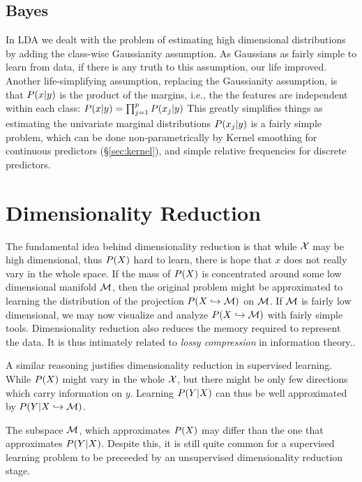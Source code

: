 \subsection{\Naive Bayes}
\label{sec:naive_bayes}
In LDA we dealt with the problem of estimating high dimensional distributions by adding the class-wise Gaussianity assumption. As Gaussians as fairly simple to learn from data, if there is any truth to this assumption, our life improved. 
Another life-simplifying assumption, replacing the Gaussianity assumption, is that $P(x|y)$ is the product of the margins, i.e., the the features are independent within each class: $P(x|y)=\prod_{j=1}^pP(x_j|y)$
This greatly simplifies things as estimating the univariate marginal distributions $P(x_j|y)$ is a fairly simple problem, which can be done non-parametrically by Kernel smoothing for continuous predictors (\S\ref{sec:kernel}), and simple relative frequencies for discrete predictors. 


\section{Dimensionality Reduction}
\label{sec:dim_reduce}
The fundamental idea behind dimensionality reduction is that while $\mathcal{X}$ may be high dimensional, thus $P(X)$ hard to learn, there is hope that $x$ does not really vary in the whole space. 
If the mass of $P(X)$ is concentrated around some low dimensional manifold $\mathcal{M}$, then the original problem might be approximated to learning the distribution of the projection $P(X \hookrightarrow \mathcal{M})$ on $\mathcal{M}$. 
If $\mathcal{M}$ is fairly low dimensional, we may now visualize and analyze $P(X \hookrightarrow \mathcal{M})$ with fairly simple tools.
Dimensionality reduction also reduces the memory required to represent the data. It is thus intimately related to \emph{lossy compression} in information theory..

A similar reasoning justifies dimensionality reduction in supervised learning. While $P(X)$ might vary in the whole $\mathcal{X}$, but there might be only few directions which carry information on $y$. Learning $P(Y|X)$ can thus be well approximated by $P(Y|X \hookrightarrow \mathcal{M})$.


\begin{remark}
The subspace $\mathcal{M}$, which approximates $P(X)$ may differ than the one that approximates $P(Y|X)$. Despite this, it is still quite common for a supervised learning problem to be preceeded by an unsupervised dimensionality reduction stage.
\end{remark}



